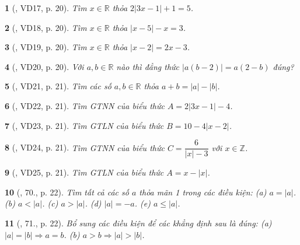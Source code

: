 \documentclass{article}
\newtheorem{baitoan}{}
\begin{document}
\begin{baitoan}[\cite{Binh_Toan_7_tap_1}, VD17, p. 20]
	Tìm $x\in\mathbb{R}$ thỏa $2|3x - 1| + 1 = 5$.
\end{baitoan}

\begin{baitoan}[\cite{Binh_Toan_7_tap_1}, VD18, p. 20]
	Tìm $x\in\mathbb{R}$ thỏa $|x - 5| - x = 3$.
\end{baitoan}

\begin{baitoan}[\cite{Binh_Toan_7_tap_1}, VD19, p. 20]
	Tìm $x\in\mathbb{R}$ thỏa $|x - 2| = 2x - 3$.
\end{baitoan}

\begin{baitoan}[\cite{Binh_Toan_7_tap_1}, VD20, p. 20]
	Với $a,b\in\mathbb{R}$ nào thì đẳng thức $|a(b - 2)| = a(2 - b)$ đúng?
\end{baitoan}

\begin{baitoan}[\cite{Binh_Toan_7_tap_1}, VD21, p. 21]
	Tìm các số $a,b\in\mathbb{R}$ thỏa $a + b = |a| - |b|$.
\end{baitoan}

\begin{baitoan}[\cite{Binh_Toan_7_tap_1}, VD22, p. 21]
	Tìm {\rm GTNN} của biểu thức $A = 2|3x - 1| - 4$.
\end{baitoan}

\begin{baitoan}[\cite{Binh_Toan_7_tap_1}, VD23, p. 21]
	Tìm {\rm GTLN} của biểu thức $B = 10 - 4|x - 2|$.
\end{baitoan}

\begin{baitoan}[\cite{Binh_Toan_7_tap_1}, VD24, p. 21]
	Tìm {\rm GTNN} của biểu thức $C = \dfrac{6}{|x| - 3}$ với $x\in\mathbb{Z}$.
\end{baitoan}

\begin{baitoan}[\cite{Binh_Toan_7_tap_1}, VD25, p. 21]
	Tìm {\rm GTLN} của biểu thức $A = x - |x|$.
\end{baitoan}

\begin{baitoan}[\cite{Binh_Toan_7_tap_1}, 70., p. 22]
	Tìm tất cả các số $a$ thỏa mãn 1 trong các điều kiện: (a) $a = |a|$. (b) $a < |a|$. (c) $a > |a|$. (d) $|a| = -a$. (e) $a\le|a|$.	
\end{baitoan}

\begin{baitoan}[\cite{Binh_Toan_7_tap_1}, 71., p. 22]
	Bổ sung các điều kiện để các khẳng định sau là đúng: (a) $|a| = |b|\Rightarrow a = b$. (b) $a > b\Rightarrow|a| > |b|$.
\end{baitoan}
\end{document}
